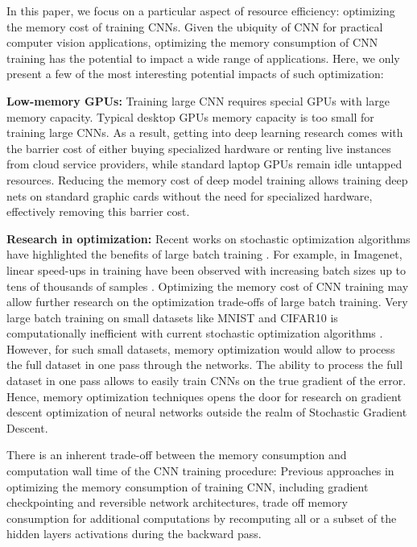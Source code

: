 \documentclass[11pt,onecolumn]{article}
\begin{document}
In this paper, we focus on a particular aspect of resource efficiency: 
optimizing the memory cost of training CNNs. 
Given the ubiquity of CNN for practical computer vision applications,
optimizing the memory consumption of CNN training has the potential to
impact a wide range of applications. 
Here, we only present a few of the most interesting 
potential impacts of such optimization:

\textbf{Low-memory GPUs:} 
Training large CNN requires special GPUs with large memory capacity. 
Typical desktop GPUs memory capacity is too small for training large CNNs.
As a result, getting into deep learning research comes 
with the barrier cost of either buying specialized hardware 
or renting live instances from cloud service providers,
while standard laptop GPUs remain idle untapped resources.
Reducing the memory cost of deep model training allows 
training deep nets on standard graphic cards without 
the need for specialized hardware, effectively removing this barrier cost.

\textbf{Research in optimization:}
Recent works on stochastic optimization algorithms have highlighted the benefits of large batch training \cite{shallue2018measuring,largebatch,xxx,xxx}.%
For example, in Imagenet, linear speed-ups in training have been observed 
with increasing batch sizes up to tens of thousands of samples \cite{largebatch}.
Optimizing the memory cost of CNN training may allow further research 
on the optimization trade-offs of large batch training.
Very large batch training on small datasets like MNIST and CIFAR10 is 
computationally inefficient with current stochastic optimization algorithms \cite{largebatch}.
However, for such small datasets, memory optimization would allow to process the full dataset 
in one pass through the networks. 
The ability to process the full dataset in one pass allows to easily train CNNs on the true gradient of the error.
Hence, memory optimization techniques opens the door for research on gradient descent 
optimization of neural networks outside the realm of Stochastic Gradient Descent.

There is an inherent trade-off between the memory consumption and computation wall time
of the CNN training procedure:
Previous approaches in optimizing the memory consumption of training CNN,
including gradient checkpointing and reversible network architectures,
trade off memory consumption for additional computations by 
recomputing all or a subset of the hidden layers activations during the backward pass.
\end{document}
